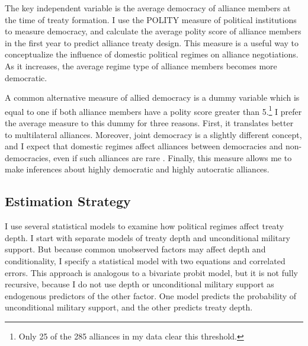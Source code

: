 \documentclass[12pt]{article}
\begin{document}
The key independent variable is the average democracy of alliance members at the time of treaty formation. 
I use the POLITY measure of political institutions to measure democracy, and calculate the average polity score of alliance members in the first year to predict alliance treaty design. 
This measure is a useful way to conceptualize the influence of domestic political regimes on alliance negotiations. 
As it increases, the average regime type of alliance members becomes more democratic. 


A common alternative measure of allied democracy is a dummy variable which is equal to one if both alliance members have a polity score greater than 5.\footnote{Only 25 of the 285 alliances in my data clear this threshold.}
I prefer the average measure to this dummy for three reasons.
First, it translates better to multilateral alliances. 
Moreover, joint democracy is a slightly different concept, and I expect that domestic regimes affect alliances between democracies and non-democracies, even if such alliances are rare \citep{Leeds1999}.
Finally, this measure allows me to make inferences about highly democratic and highly autocratic alliances. 



\subsection{Estimation Strategy}

I use several statistical models to examine how political regimes affect treaty depth. 
I start with separate models of treaty depth and unconditional military support. 
But because common unobserved factors may affect depth and conditionality, I specify a statistical model with two equations and correlated errors.
This approach is analogous to a bivariate probit model, but it is not fully recursive, because I do not use depth or unconditional military support as endogenous predictors of the other factor. 
One model predicts the probability of unconditional military support, and the other predicts treaty depth.
\end{document}
